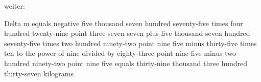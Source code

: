 weiter:

Delta m equals negative five thousand seven hundred seventy-five times four hundred twenty-nine point three seven seven plus five thousand seven hundred seventy-five times two hundred ninety-two point nine five minus thirty-five times ten to the power of nine divided by eighty-three point nine five minus two hundred ninety-two point nine five equals thirty-nine thousand three hundred thirty-seven kilograms